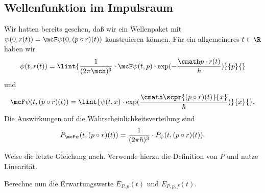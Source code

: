\documentclass{subfiles}
\begin{document}
    \subsection{Wellenfunktion im Impulsraum}
        Wir hatten bereits gesehen, daß wir ein Wellenpaket mit $\psi(0,r(t)) = \mcF\psi(0,(p\circ r)(t))$ konstruieren können. Für ein allgemeineres $t\in\R$ haben wir 
        \[\psi(t,r(t)) = \lint{\frac{1}{(2\pi\mch)^3}\cdot \mcF\psi(t,p)\cdot\exp(-\frac{\cmath p\cdot r(t)}{\hbar})}{p}{}\]
        und
        \[\mcF\psi(t,(p\circ r)(t)) = \lint{\psi(t,x)\cdot\exp(\frac{\cmath\scpr{(p\circ r)(t)}{x}}{\hbar})}{x}{}.\]
        Die Auswirkungen auf die Wahrscheinlichkeitsverteilung sind 
        \[P_{\mcF\psi}(t,(p\circ r)(t)) = \frac{1}{(2\pi\hbar)^3}\cdot P_\psi(t,(p\circ r)(t)).\]

        \begin{Aufgabe}
            \nr{} Weise die letzte Gleichung nach. Verwende hierzu die Definition von $P$ und nutze Linearität. 

            \nr{} Berechne nun die Erwartungswerte $E_{P,p}(t)$ und $E_{P,p,f}(t)$. 
        \end{Aufgabe}
\end{document}
